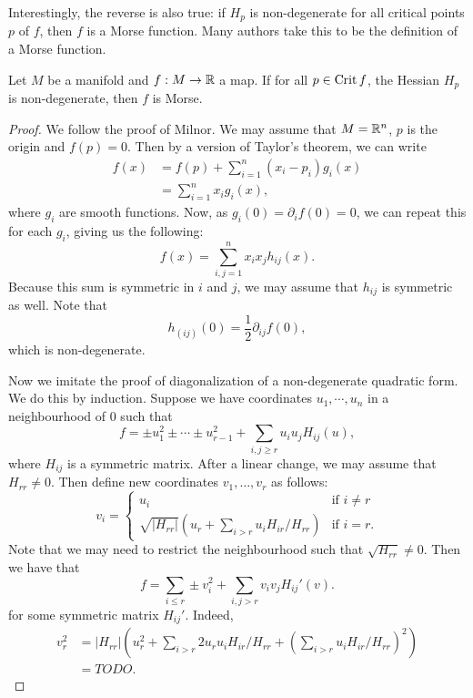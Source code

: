 Interestingly, the reverse is also true: if $H_p$ is non-degenerate for all critical points  $p$ of $f$, then  $f$ is a Morse function.
Many authors take this to be the definition of a Morse function.

\begin{lemma}
    Let $M$ be a manifold and $f: M \to  \mathbb{R}$ a map.
    If for all $p \in \operatorname{Crit} f$, the Hessian $H_p$ is non-degenerate, then $f$ is Morse.
\end{lemma}
\begin{proof}
    We follow the proof of Milnor.
    We may assume that $M = \mathbb{R}^{n}$, $p$ is the origin and $f(p) = 0$.
    Then by a version of Taylor's theorem, we can write
    \begin{align*}
        f(x)  &= f(p) + \sum_{i=1}^{n} (x_i - p_i) g_i (x)\\
              &= \sum_{i=1}^{n} x_i g_i(x)
    ,\end{align*} 
    where $g_i$ are smooth functions. 
    Now, as $g_i(0) = \partial_i f (0) = 0$, we can repeat this for each  $g_i$, giving us the following:
    \[
        f(x) = \sum_{i, j= 1}^{n} x_i x_j h_{ij}(x)
    .\] 
    Because this sum is symmetric in $i$ and  $j$, we may assume that  $h_{ij}$ is symmetric as well.
    Note that
    \[
        h_{(ij)}(0) = \frac{1}{2} \partial_{ij} f(0)
    ,\]
    which is non-degenerate.

    Now we imitate the proof of diagonalization of a non-degenerate quadratic form.
    We do this by induction.
    Suppose we have coordinates $u_1, \cdots, u_n$ in a neighbourhood of $0$ such that
    \[
        f = \pm u_1^2 \pm \cdots \pm u_{r-1}^2 + \sum_{i,j\ge r} u_i u_j H_{ij}(u)
    ,\] 
    where $H_{ij}$ is a symmetric matrix.
    After a linear change, we may assume that $H_{rr} \neq 0$.
    Then define new coordinates $ v_1, \ldots, v_r$ as follows:
    \[
        v_i = \begin{cases}
            u_i & \text{if $i \neq r$}\\
            \sqrt{|H_{rr}|} (u_r + \sum_{i > r} u_i H_{ir} / H_{rr}) & \text{if $i = r$.}
        \end{cases}
    \] 
    Note that we may need to restrict the neighbourhood such that $\sqrt{H_{rr}} \neq 0$.
    Then we have that
    \[
        f = \sum_{i\le r} \pm v_i^2 + \sum_{i,j > r} v_i v_j H_{ij}'(v)
    .\] 
    for some symmetric matrix $H_{ij}'$.
    Indeed,
    \begin{align*}
        v_r^2 &= |H_{rr}| \left(u_r^2 + \sum_{i>r} 2 u_r u_i H_{ir} / H_{rr} + \left(\sum_{i>r} u_i H_{ir} / H_{rr}\right)^2\right)\\
              &= TODO
    .\end{align*} 

\end{proof}

